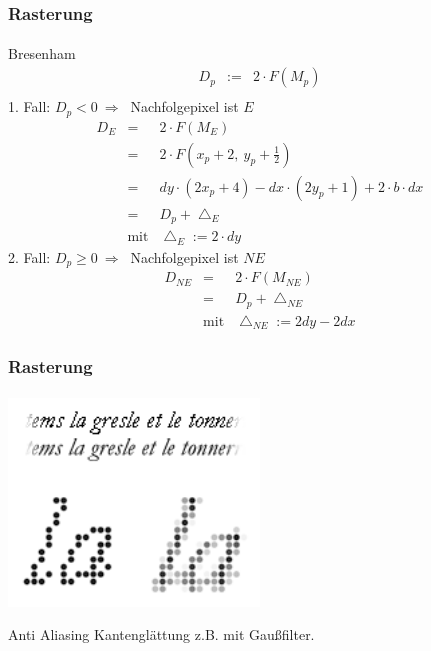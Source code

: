 \documentclass{beamer}
\begin{document}
\begin{frame}
    \frametitle{Rasterung}
\framesubtitle{}
\begin{block}{Bresenham}
\begin{equation*}\begin{matrix}
        D_p & := & 2 \cdot F\left(M_p\right) \\
         \end{matrix}\end{equation*}
    1. Fall: $D_p < 0 ~\Rightarrow~$ Nachfolgepixel ist $E$
    \begin{equation*}\begin{matrix}
        D_E & = & 2 \cdot F\left(M_E\right) \\
        & = & 2 \cdot F\left(x_p + 2,~ y_p + \frac{1}{2}\right) \\
        & = & dy \cdot \left(2 x_p + 4\right) 
            - dx \cdot \left(2 y_p + 1\right) 
            + 2 \cdot b \cdot dx \\
        & = & D_p + \bigtriangleup_E \\
        & \textrm{mit} & \bigtriangleup_E := 2 \cdot dy
    \end{matrix}\end{equation*}
    2. Fall: $D_p \ge 0 ~\Rightarrow~$ Nachfolgepixel ist $NE$ \\
    \begin{equation*}\begin{matrix}
        D_{NE} & = & 2 \cdot F\left( M_{NE} \right) \\
        & = & D_p + \bigtriangleup_{NE} \\
        & \textrm{mit} & \bigtriangleup_{NE} := 2dy - 2dx
    \end{matrix}\end{equation*}
\end{block}
\end{frame}



\begin{frame}
    \frametitle{Rasterung}
\framesubtitle{}
\begin{center}
    \includegraphics[width=0.5\textwidth]{images/Antialiasing}
\end{center}
\begin{block}{Anti Aliasing}
Kantenglättung z.B. mit Gaußfilter.
\end{block}
\end{frame}
\end{document}
